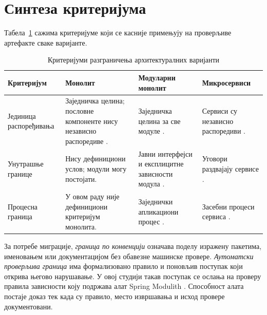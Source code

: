 \documentclass[12pt,oneside]{memoir}
\begin{document}
\section{Синтеза критеријума}

Табела~\ref{tab:teorija-kriterijumi} сажима критеријуме који се касније
примењују на проверљиве артефакте сваке варијанте.

\begin{table}[!ht]
	\centering
	\small
	\begin{tabular}{|p{}|p{}|p{}|p{}|}
		\hline
		\textbf{Критеријум}    & \textbf{Монолит}                                                                                                          & \textbf{Модуларни монолит}                                                     & \textbf{Микросервиси}                                           \\
		\hline
		Јединица распоређивања & Заједничка целина; пословне компоненте нису независно распоредиве \cite{lewis2014microservices,dragoni2017microservices}. & Заједничка целина за све модуле \cite{su2024modularMonolith}.                  & Сервиси су независно распоредиви \cite{lewis2014microservices}. \\
		\hline
		Унутрашње границе      & Нису дефинициони услов; модули могу постојати.                                                                            & Јавни интерфејси и експлицитне зависности модула \cite{su2024modularMonolith}. & Уговори раздвајају сервисе \cite{lewis2014microservices}.       \\
		\hline
		Процесна граница       & У овом раду није дефинициони критеријум монолита.                                                                         & Заједнички апликациони процес \cite{su2024modularMonolith}.                    & Засебни процеси сервиса \cite{dragoni2017microservices}.        \\
		\hline
	\end{tabular}
	\caption{Критеријуми разграничења архитектуралних варијанти}
	\label{tab:teorija-kriterijumi}
\end{table}

За потребе миграције, \emph{граница по конвенцији} означава поделу изражену
пакетима, именовањем или документацијом без обавезне машинске провере.
\emph{Аутоматски проверљива граница} има формализовано правило и поновљив
поступак који открива његово нарушавање. У овој студији такав поступак се
ослања на проверу правила зависности коју подржава алат {\lat Spring Modulith}
\cite{springModulith2026fundamentals}. Способност алата постаје доказ тек када
су правило, место извршавања и исход провере документовани.
\end{document}
